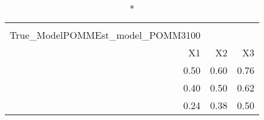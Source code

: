 \begin{longtable}{rrr}
\caption*{
{\large Pestmatrix} \\ 
{\small True\_ModelPOMMEst\_model\_POMM3100}
} \\ 
\toprule
X1 & X2 & X3 \\ 
\midrule
0.50 & 0.60 & 0.76 \\ 
0.40 & 0.50 & 0.62 \\ 
0.24 & 0.38 & 0.50 \\ 
\bottomrule
\end{longtable}

